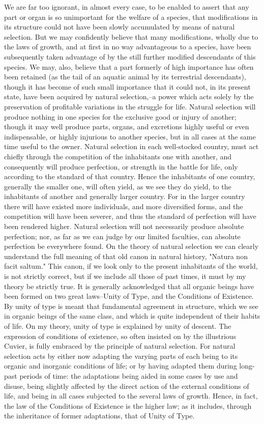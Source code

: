 We are far too ignorant, in almost every case, to be enabled to assert that any part or organ is so unimportant for the welfare of a species, that modifications in its structure could not have been slowly accumulated by means of natural selection. But we may confidently believe that many modifications, wholly due to the laws of growth, and at first in no way advantageous to a species, have been subsequently taken advantage of by the still further modified descendants of this species. We may, also, believe that a part formerly of high importance has often been retained (as the tail of an aquatic animal by its terrestrial descendants), though it has become of such small importance that it could not, in its present state, have been acquired by natural selection,--a power which acts solely by the preservation of profitable variations in the struggle for life.
Natural selection will produce nothing in one species for the exclusive good or injury of another; though it may well produce parts, organs, and excretions highly useful or even indispensable, or highly injurious to another species, but in all cases at the same time useful to the owner. Natural selection in each well-stocked country, must act chiefly through the competition of the inhabitants one with another, and consequently will produce perfection, or strength in the battle for life, only according to the standard of that country. Hence the inhabitants of one country, generally the smaller one, will often yield, as we see they do yield, to the inhabitants of another and generally larger country. For in the larger country there will have existed more individuals, and more diversified forms, and the competition will have been severer, and thus the standard of perfection will have been rendered higher. Natural selection will not necessarily produce absolute perfection; nor, as far as we can judge by our limited faculties, can absolute perfection be everywhere found.
On the theory of natural selection we can clearly understand the full meaning of that old canon in natural history, "Natura non facit saltum." This canon, if we look only to the present inhabitants of the world, is not strictly correct, but if we include all those of past times, it must by my theory be strictly true.
It is generally acknowledged that all organic beings have been formed on two great laws--Unity of Type, and the Conditions of Existence. By unity of type is meant that fundamental agreement in structure, which we see in organic beings of the same class, and which is quite independent of their habits of life. On my theory, unity of type is explained by unity of descent. The expression of conditions of existence, so often insisted on by the illustrious Cuvier, is fully embraced by the principle of natural selection. For natural selection acts by either now adapting the varying parts of each being to its organic and inorganic conditions of life; or by having adapted them during long-past periods of time: the adaptations being aided in some cases by use and disuse, being slightly affected by the direct action of the external conditions of life, and being in all cases subjected to the several laws of growth. Hence, in fact, the law of the Conditions of Existence is the higher law; as it includes, through the inheritance of former adaptations, that of Unity of Type. 